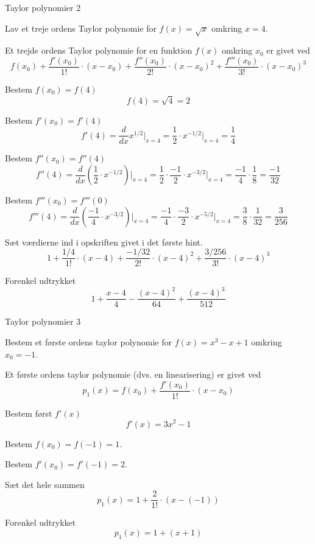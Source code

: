 \documentclass{article}
\begin{document}
\begin{exercise}{Taylor polynomier 2}

Lav et treje ordens Taylor polynomie for $f(x) = \sqrt{x}$
omkring $x = 4$.


\hint
Et trejde ordens Taylor polynomie for en funktion $f(x)$
omkring $x_0$ er givet ved
\[
f(x_0) + \frac{f'(x_0)}{1!} \cdot (x - x_0) + \frac{f''(x_0)}{2!} \cdot (x - x_0)^2 + \frac{f'''(x_0)}{3!} \cdot (x - x_0)^3
\]

\hint
Bestem $f(x_0) = f(4)$
\[
f(4) = \sqrt{4} = 2
\]

\hint
Bestem $f'(x_0) = f'(4)$
\[
f'(4) = \frac{d}{dx} x^{1/2} \Big|_{x = 4} = \frac{1}{2} \cdot x^{-1/2} \Big|_{x = 4} = \frac{1}{4}
\]

\hint
Bestem $f''(x_0) = f''(4)$
\[
f''(4) = \frac{d}{dx} \left( \frac{1}{2} \cdot x^{-1/2} \right) \Big|_{x = 4} = \frac{1}{2} \cdot \frac{-1}{2} \cdot x^{-3/2} \Big|_{x = 4} = \frac{-1}{4} \cdot \frac{1}{8} = \frac{-1}{32}
\]

\hint
Bestem $f'''(x_0) = f'''(0)$
\[
f'''(4) = \frac{d}{dx} \left( \frac{-1}{4} \cdot x^{-3/2} \right) \Big|_{x = 4} = \frac{-1}{4} \cdot \frac{-3}{2} \cdot x^{-5/2} \Big|_{x = 4} = \frac{3}{8} \cdot \frac{1}{32} = \frac{3}{256}
\]

\hint
Sæt værdierne ind i opskriften givet i det første hint.
\[
1 + \frac{1/4}{1!} \cdot (x - 4) + \frac{-1 / 32}{2!} \cdot (x - 4)^2 + \frac{3 / 256}{3!} \cdot (x - 4)^3
\]

\hint
Forenkel udtrykket
\[
1 + \frac{x - 4}{4} - \frac{(x - 4)^2}{64} + \frac{(x - 4)^3}{512}
\]

\end{exercise}

\begin{exercise}{Taylor polynomier 3}

Bestem et første ordens taylor polynomie for $f(x) = x^3 - x + 1$
omkring $x_0 = -1$.


\hint
Et første ordens taylor polynomie (dvs. en linearisering)
er givet ved
\[
p_1(x) = f(x_0) + \frac{f'(x_0)}{1!} \cdot (x - x_0)
\]


\hint
Bestem først $f'(x)$
\[
f'(x) = 3x^2 - 1
\]

\hint
Bestem $f(x_0) = f(-1) = 1$.

\hint
Bestem $f'(x_0) = f'(-1) = 2$.

\hint
Sæt det hele sammen
\[
p_1(x) = 1 + \frac{2}{1!} \cdot \left(x - (-1)\right)
\]

\hint
Forenkel udtrykket
\[
p_1(x) = 1 + (x + 1)
\]


\end{exercise}
\end{document}
